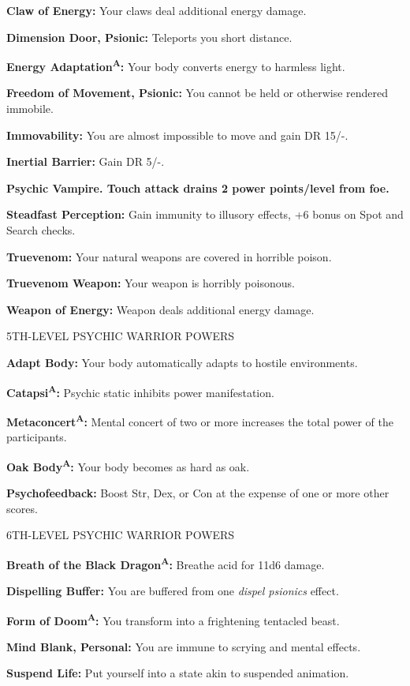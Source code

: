 \documentclass{article}
\begin{document}
\textbf{Claw of Energy: }Your claws deal additional energy damage.

\textbf{Dimension Door, Psionic: }Teleports you short distance. 

\textbf{Energy Adaptation}\textsuperscript{\textbf{A}}\textbf{: }Your body converts 
energy to harmless light.

\textbf{Freedom of Movement, Psionic: }You cannot be held or otherwise rendered 
immobile.

\textbf{Immovability: }You are almost impossible to move and gain DR 15/-.

\textbf{Inertial Barrier: }Gain DR 5/-.

\textbf{Psychic Vampire. Touch attack drains 2 power points/level from foe. }

\textbf{Steadfast Perception: }Gain immunity to illusory effects, +6 bonus on Spot 
and Search checks.

\textbf{Truevenom: }Your natural weapons are covered in horrible poison.

\textbf{Truevenom Weapon: }Your weapon is horribly poisonous. 

\textbf{Weapon of Energy: }Weapon deals additional energy damage.

5TH-LEVEL PSYCHIC WARRIOR POWERS 

\textbf{Adapt Body: }Your body automatically adapts to hostile environments.

\textbf{Catapsi}\textsuperscript{\textbf{A}}\textbf{: }Psychic static inhibits 
power manifestation.

\textbf{Metaconcert}\textsuperscript{\textbf{A}}\textbf{: }Mental concert of two 
or more increases the total power of the participants.

\textbf{Oak Body}\textsuperscript{\textbf{A}}\textbf{: }Your body becomes as hard 
as oak.

\textbf{Psychofeedback: }Boost Str, Dex, or Con at the expense of one or more other 
scores.

6TH-LEVEL PSYCHIC WARRIOR POWERS

\textbf{Breath of the Black Dragon}\textsuperscript{\textbf{A}}\textbf{:} Breathe 
acid for 11d6 damage.

\textbf{Dispelling Buffer:} You are buffered from one \textit{dispel psionics }effect.

\textbf{Form of Doom}\textsuperscript{\textbf{A}}\textbf{:} You transform into 
a frightening tentacled beast.

\textbf{Mind Blank, Personal:} You are immune to scrying and mental effects.

\textbf{Suspend Life:} Put yourself into a state akin to suspended animation.

\newpage
\end{document}

